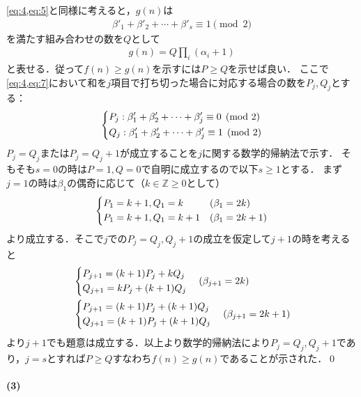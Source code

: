 \documentclass[../../main.tex]{subfiles}
\begin{document}
\cref{eq:4,eq:5}と同様に考えると，$g(n)$は
\begin{align}
  \beta'_1 + \beta'_2 + \cdots + \beta'_s \equiv 1 \pmod{2}  \label{eq:7}
\end{align}
を満たす組み合わせの数を$Q$として
\begin{align}
  g(n) = Q\prod_i(\alpha_i+1) \label{eq:8}
\end{align}
と表せる．従って$f(n) \ge g(n)$を示すには$P \ge Q$を示せば良い．
ここで\cref{eq:4,eq:7}において和を$j$項目で打ち切った場合に対応する場合の数を$P_j,Q_j$とする：
\begin{align}
  \begin{dcases}
    P_j: \beta'_1 + \beta'_2 + \cdots + \beta'_j \equiv 0 \pmod{2} \\
    Q_j: \beta'_1 + \beta'_2 + \cdots + \beta'_j \equiv 1 \pmod{2}
  \end{dcases}
\end{align}
$P_j =Q_j$または$P_j = Q_j+1$が成立することを$j$に関する数学的帰納法で示す．
そもそも$s=0$の時は$P=1,Q=0$で自明に成立するので以下$s \ge 1$とする．
まず$j=1$の時は$\beta_1$の偶奇に応じて（$k\in\mathbb{Z}\ge0$として）
\begin{align}
  \begin{dcases}
    P_1 = k+1, Q_1 = k   & (\beta_1 = 2k) \\
    P_1 = k+1, Q_1 = k+1 & (\beta_1 = 2k+1)
  \end{dcases} \label{eq:9}
\end{align}
より成立する．そこで$j$での$P_j = Q_j, Q_j+1$の成立を仮定して$j+1$の時を考えると
\begin{align}
  &
  \begin{dcases}
    P_{j+1} = (k+1)P_{j}+kQ_{j} \\
    Q_{j+1} = kP_{j}+(k+1)Q_{j}
  \end{dcases} \quad (\beta_{j+1}=2k) \\
  &
  \begin{dcases}
    P_{j+1} = (k+1)P_{j}+(k+1)Q_{j} \\
    Q_{j+1} = (k+1)P_{j}+(k+1)Q_{j}
  \end{dcases} \quad (\beta_{j+1}=2k+1)
\end{align}
より$j+1$でも題意は成立する．以上より数学的帰納法により$P_j=Q_j, Q_j+1$であり，$j=s$とすれば$P \ge Q$すなわち$f(n) \ge g(n)$であることが示された．\qed

\paragraph{(3)}
\end{document}
